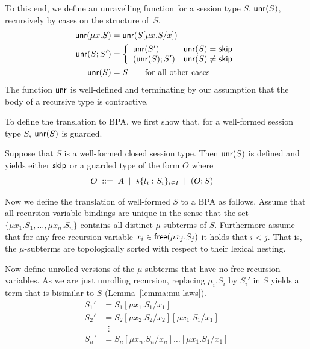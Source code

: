 To this end, we define an unravelling function for a session type $S$,
$\mathsf{unr}(S)$, recursively by cases on the structure of~$S$.
\begin{align*}
  \Unravel(\mu x.S) & = \Unravel(S[\mu x.S/x])
  \\
  \Unravel (S;S') &= \left\{%
  \begin{array}{ll}
    \Unravel(S') & \Unravel(S) = \skipk
    \\
    (\Unravel(S); S') & \Unravel(S) \ne \skipk
  \end{array}
                        \right.
  \\
  \Unravel (S) &= S \qquad \text{for all other cases}
\end{align*}
The function $\mathsf{unr}$ is well-defined and terminating by our
assumption that the body of a recursive type is contractive. 


To define the translation to BPA,
we first show that, for a well-formed session type $S$, $\mathsf{unr}
(S)$ is guarded.
\begin{lemma}
  \label{lem:unravel-yields-guarded-types}
  Suppose that $S$ is a well-formed closed session type.
  Then $\mathsf{unr} (S)$ is defined and yields either $\mathsf{skip}$ or a
  guarded type of the form $O$ where
\begin{align*}
  O &\; ::= \; A \;\mid\; \star\{l_i:S_i\}_{i\in I} \;\mid\; (O; S)
\end{align*}
\end{lemma}


Now we define the translation of well-formed $S$ to a BPA as
follows. Assume that all recursion variable bindings are unique in the
sense that the set $\{ \mu x_1.S_1, \dots, \mu x_n.S_n\}$ contains all
distinct $\mu$-subterms of $S$.  Furthermore assume that for any free
recursion variable $x_i \in \mathsf{free}(\mu x_j.S_j)$ it holds that
$i<j$. That is, the $\mu$-subterms are topologically sorted with
respect to their lexical nesting.


Now define unrolled versions of the $\mu$-subterms that have no free
recursion variables. As we are just unrolling recursion, replacing
$\mu_i.S_i$ by $S_i'$ in $S$ yields a term that is bisimilar to $S$
(Lemma~\ref{lemma:mu-laws}).
%
\begin{align*}
  S_1' &= S_1[\mu x_1.S_1/x_1] \\
  S_2' &= S_2[\mu x_2.S_2/x_2][\mu x_1.S_1/x_1] \\
       &\;\;\vdots \\
  S_n' &= S_n[\mu x_n.S_n/x_n]\dots [\mu x_1.S_1/x_1]
\end{align*}

